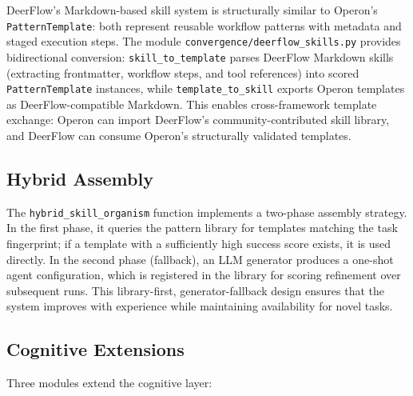 \documentclass[11pt]{article}
\begin{document}
DeerFlow's Markdown-based skill system is structurally similar to Operon's
\texttt{PatternTemplate}: both represent reusable workflow patterns with
metadata and staged execution steps.  The module
\texttt{convergence/deerflow\_skills.py} provides bidirectional conversion:
\texttt{skill\_to\_template} parses DeerFlow Markdown skills (extracting
frontmatter, workflow steps, and tool references) into scored
\texttt{PatternTemplate} instances, while \texttt{template\_to\_skill}
exports Operon templates as DeerFlow-compatible Markdown.  This enables
cross-framework template exchange: Operon can import DeerFlow's
community-contributed skill library, and DeerFlow can consume Operon's
structurally validated templates.

\subsection{Hybrid Assembly}

The \texttt{hybrid\_skill\_organism} function implements a two-phase
assembly strategy.  In the first phase, it queries the pattern library for
templates matching the task fingerprint; if a template with a sufficiently
high success score exists, it is used directly.  In the second phase
(fallback), an LLM generator produces a one-shot agent configuration, which is
registered in the library for scoring refinement over subsequent runs.
This library-first, generator-fallback design ensures that the system
improves with experience while maintaining availability for novel tasks.

\subsection{Cognitive Extensions}

Three modules extend the cognitive layer:
\end{document}
